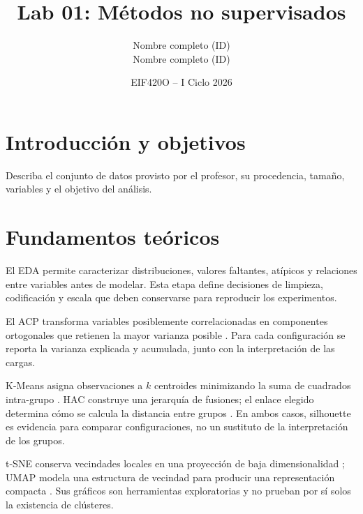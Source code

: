 \documentclass[11pt]{article}
\title{Lab 01: Métodos no supervisados}
\author{Nombre completo (ID) \\ Nombre completo (ID)}
\date{EIF420O -- I Ciclo 2026}
\begin{document}
\maketitle

\section{Introducción y objetivos}
Describa el conjunto de datos provisto por el profesor, su procedencia, tamaño,
variables y el objetivo del análisis.

\section{Fundamentos teóricos}
El EDA permite caracterizar distribuciones, valores faltantes, atípicos y
relaciones entre variables antes de modelar. Esta etapa define decisiones de
limpieza, codificación y escala que deben conservarse para reproducir los
experimentos.

El ACP transforma variables posiblemente correlacionadas en componentes
ortogonales que retienen la mayor varianza posible \cite{jolliffe2002}. Para
cada configuración se reporta la varianza explicada y acumulada, junto con la
interpretación de las cargas.

K-Means asigna observaciones a $k$ centroides minimizando la suma de cuadrados
intra-grupo \cite{macqueen1967}. HAC construye una jerarquía de fusiones; el
enlace elegido determina cómo se calcula la distancia entre grupos
\cite{murtagh2012}. En ambos casos, silhouette es evidencia para comparar
configuraciones, no un sustituto de la interpretación de los grupos.

t-SNE conserva vecindades locales en una proyección de baja dimensionalidad
\cite{vandermaaten2008}; UMAP modela una estructura de vecindad para producir
una representación compacta \cite{mcinnes2018}. Sus gráficos son herramientas
exploratorias y no prueban por sí solos la existencia de clústeres.

\begin{center}
\end{center}
\end{document}
